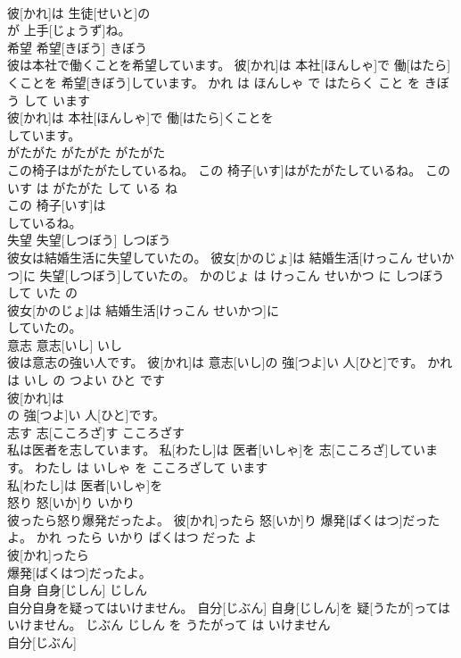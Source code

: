 \documentclass[8pt]{extreport}
\begin{document}
\begin{CJK}{UTF8}{min}
\\	彼[かれ]は 生徒[せいと]の
\\	が 上手[じょうず]ね。			
\\	希望	希望[きぼう]	きぼう	
\\	彼は本社で働くことを希望しています。	彼[かれ]は 本社[ほんしゃ]で 働[はたら]くことを 希望[きぼう]しています。	かれ は ほんしゃ で はたらく こと を きぼう して います	
\\	彼[かれ]は 本社[ほんしゃ]で 働[はたら]くことを
\\	しています。			
\\	がたがた	がたがた	がたがた	
\\	この椅子はがたがたしているね。	この 椅子[いす]はがたがたしているね。	この いす は がたがた して いる ね	
\\	この 椅子[いす]は
\\	しているね。			
\\	失望	失望[しつぼう]	しつぼう	
\\	彼女は結婚生活に失望していたの。	彼女[かのじょ]は 結婚生活[けっこん せいかつ]に 失望[しつぼう]していたの。	かのじょ は けっこん せいかつ に しつぼう して いた の	
\\	彼女[かのじょ]は 結婚生活[けっこん せいかつ]に
\\	していたの。			
\\	意志	意志[いし]	いし	
\\	彼は意志の強い人です。	彼[かれ]は 意志[いし]の 強[つよ]い 人[ひと]です。	かれ は いし の つよい ひと です	
\\	彼[かれ]は
\\	の 強[つよ]い 人[ひと]です。			
\\	志す	志[こころざ]す	こころざす	
\\	私は医者を志しています。	私[わたし]は 医者[いしゃ]を 志[こころざ]しています。	わたし は いしゃ を こころざして います	
\\	私[わたし]は 医者[いしゃ]を
\\	怒り	怒[いか]り	いかり	
\\	彼ったら怒り爆発だったよ。	彼[かれ]ったら 怒[いか]り 爆発[ばくはつ]だったよ。	かれ ったら いかり ばくはつ だった よ	
\\	彼[かれ]ったら
\\	爆発[ばくはつ]だったよ。			
\\	自身	自身[じしん]	じしん	
\\	自分自身を疑ってはいけません。	自分[じぶん] 自身[じしん]を 疑[うたが]ってはいけません。	じぶん じしん を うたがって は いけません	
\\	自分[じぶん]

\end{CJK}
\end{document}
